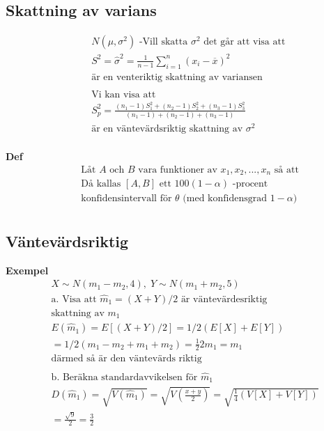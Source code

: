 \begin{multicols}{2}
\subsection{Skattning av varians}
\begin{align*}
  &\quad  N(\mu,\sigma^2) \text{ -Vill skatta $\sigma^2$ det går att visa att }  \\
  &\quad  S^2 = \hat{\sigma}^2 = \frac{1}{n-1}\sum_{i=1}^n (x_i-\overline{x})^2 \\
  &\quad  \text{är en venteriktig skattning av variansen }  \\
  &\quad  \\
  &\quad  \text{Vi kan visa att }  \\
  &\quad  S_p^2 = \frac{(n_1-1)S_1^2 + (n_2-1)S_2^2 + (n_3-1)S_3^2}{(n_1-1)+(n_2-1)+(n_3-1)}\\
  &\quad  \text{är en väntevärdsriktig skattning av } \sigma^2  \\
\end{align*}

\textbf{Def}
\begin{align*}
  &\quad  \text{Låt $A$ och $B$ vara funktioner av $x_1,x_2,...,x_n$ så att} \\
  &\quad  \text{Då kallas $[A,B]$ ett $100(1-\alpha)$ -procent} \\
  &\quad  \text{konfidensintervall för $\theta$ (med konfidensgrad $1-\alpha$)} \\
\end{align*}

\subsection{Väntevärdsriktig}
\textbf{Exempel}
\begin{align*}
  &X\sim{N(m_1-m_2, 4)}, \; Y\sim{N(m_1+m_2,5)} \\
  &\text{a. Visa att $\hat{m}_1=(X+Y)/2$ är väntevärdesriktig} \\
  &\text{skattning av $m_1$} \\
  &E(\hat{m}_1) = E[(X+Y)/2] = 1/2(E[X]+E[Y]) \\
  &= 1/2(m_1-m_2 + m_1+m_2)= \frac{1}{2}2m_1=m_1 \\
  &\text{därmed så är den väntevärds riktig} \\
  &\\
  &\text{b. Beräkna standardavvikelsen för $\hat{m}_1$} \\
  &D(\hat{m}_1) = \sqrt{V(\hat{m}_1)} = \sqrt{V(\frac{x+y}{2})} = \sqrt{\frac{1}{4}(V[X]+V[Y])} \\
  &= \frac{\sqrt{9}}{2} = \frac{3}{2} \\
\end{align*}



\end{multicols}
